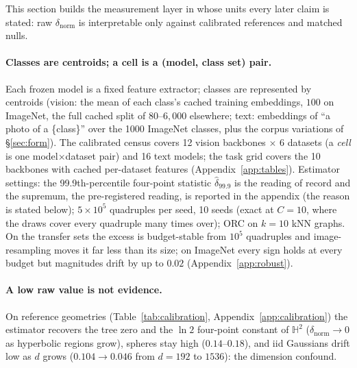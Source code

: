 This section builds the measurement layer in whose units every later claim is stated: raw $\delta_{\text{norm}}$ is interpretable only against calibrated references and matched nulls.

\paragraph{Classes are centroids; a cell is a (model, class set) pair.} Each frozen model is a fixed feature extractor; classes are represented by centroids (vision: the mean of each class's cached training embeddings, $100$ on ImageNet, the full cached split of $80$--$6{,}000$ elsewhere; text: embeddings of ``a photo of a \{class\}'' over the 1000 ImageNet classes, plus the corpus variations of \S\ref{sec:form}). The calibrated census covers 12 vision backbones $\times$ 6 datasets (a \emph{cell} is one model$\times$dataset pair) and 16 text models; the task grid covers the 10 backbones with cached per-dataset features (Appendix~\ref{app:tables}).
Estimator settings: the 99.9th-percentile four-point statistic $\hat\delta_{99.9}$ is the reading of record and the supremum, the pre-registered reading, is reported in the appendix (the reason is stated below); $5{\times}10^5$ quadruples per seed, 10 seeds (exact at $C{=}10$, where the draws cover every quadruple many times over); ORC on $k{=}10$ kNN graphs. On the transfer sets the excess is budget-stable from $10^5$ quadruples and image-resampling moves it far less than its size; on ImageNet every sign holds at every budget but magnitudes drift by up to $0.02$ (Appendix~\ref{app:robust}).

\paragraph{A low raw value is not evidence.} On reference geometries (Table~\ref{tab:calibration}, Appendix~\ref{app:calibration}) the estimator recovers the tree zero and the $\ln 2$ four-point constant of $\mathbb{H}^2$ ($\delta_{\text{norm}}\to0$ as hyperbolic regions grow), spheres stay high ($0.14$--$0.18$), and iid Gaussians drift low as $d$ grows ($0.104\to0.046$ from $d{=}192$ to $1536$): the dimension confound.

